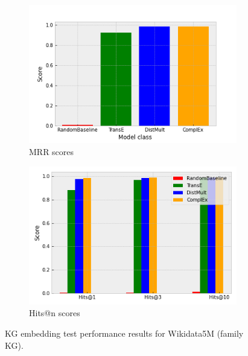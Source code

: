 \begin{figure}[h]
\centering
\begin{subfigure}{.5\textwidth}
  \centering
  \includegraphics[width=1\linewidth]{figures/model_selection/family_mrr.png}
  \caption{MRR scores}
  \label{fig:sub1}
\end{subfigure}%
\begin{subfigure}{.5\textwidth}
  \centering
  \includegraphics[width=1\linewidth]{figures/model_selection/family_hit_scores.png}
  \caption{Hits@n scores}
  \label{fig:sub2}
\end{subfigure}
\caption{KG embedding test performance results for Wikidata5M (family KG).}
\label{fig:test}
\end{figure}

